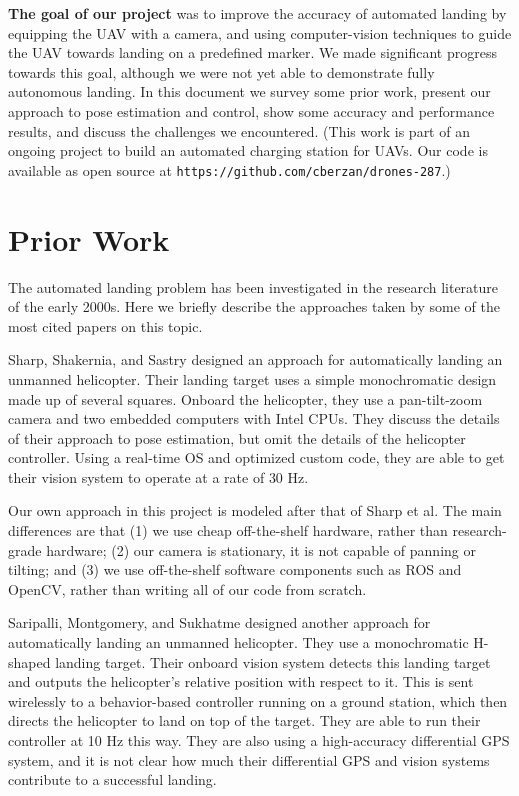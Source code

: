 \documentclass[10pt]{scrartcl} %
\begin{document}
{\bf The goal of our project} was to improve the accuracy of automated landing
by equipping the UAV with a camera, and using computer-vision techniques to
guide the UAV towards landing on a predefined marker. We made significant
progress towards this goal, although we were not yet able to demonstrate fully
autonomous landing. In this document we survey some prior work, present our
approach to pose estimation and control, show some accuracy and performance
results, and discuss the challenges we encountered. (This work is part of an
ongoing project to build an automated charging station for UAVs. Our code is
available as open source at {\tt https://github.com/cberzan/drones-287}.)


\section{Prior Work}

The automated landing problem has been investigated in the research literature
of the early 2000s. Here we briefly describe the approaches taken by some of
the most cited papers on this topic.

Sharp, Shakernia, and Sastry \cite{sharp_et_al_2001} designed an approach for
automatically landing an unmanned helicopter. Their landing target uses a
simple monochromatic design made up of several squares. Onboard the helicopter,
they use a pan-tilt-zoom camera and two embedded computers with Intel CPUs.
They discuss the details of their approach to pose estimation, but omit the
details of the helicopter controller. Using a real-time OS and optimized custom
code, they are able to get their vision system to operate at a rate of 30 Hz.

Our own approach in this project is modeled after that of Sharp et al. The main
differences are that (1) we use cheap off-the-shelf hardware, rather than
research-grade hardware; (2) our camera is stationary, it is not capable of
panning or tilting; and (3) we use off-the-shelf software components such as
ROS and OpenCV, rather than writing all of our code from scratch.

Saripalli, Montgomery, and Sukhatme \cite{saripalli_et_al_2002} designed
another approach for automatically landing an unmanned helicopter. They use a
monochromatic H-shaped landing target. Their onboard vision system detects this
landing target and outputs the helicopter's relative position with respect to
it. This is sent wirelessly to a behavior-based controller running on a ground
station, which then directs the helicopter to land on top of the target. They
are able to run their controller at 10 Hz this way. They are also using a
high-accuracy differential GPS system, and it is not clear how much their
differential GPS and vision systems contribute to a successful landing.
\end{document}
